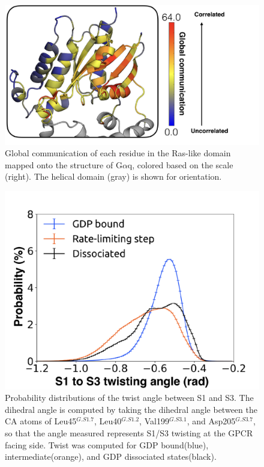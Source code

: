 \documentclass[../main.tex]{subfiles}
\begin{document}
    \begin{figure}[!htb] %
        \centering
        \includegraphics[width=5in]{ch4-fig8-supp1.png}
        \caption[Global communication of each residue in the Ras-like domain mapped onto the structure of G$\alpha$q, colored based on the scale (right). ]
            {Global communication of each residue in the Ras-like domain mapped onto the structure of G$\alpha$q, colored based on the scale (right). The helical domain (gray) is shown for orientation.}
        \label{fig:ch4-fig8-supp1}
    \end{figure}

    \begin{figure}[!htb] %
        \centering
        \includegraphics[width=5in]{ch4-fig9-supp1.png}
        \caption[Probability distributions of the twist angle between S1 and S3.]
            {Probability distributions of the twist angle between S1 and S3. The dihedral angle is computed by taking the dihedral angle between the CA atoms of Leu45$^{G.S1.7}$, Leu40$^{G.S1.2}$, Val199$^{G.S3.1}$, and Asp205$^{G.S3.7}$, so that the angle measured represents S1/S3 twisting at the GPCR facing side. Twist was computed for GDP bound(blue), intermediate(orange), and GDP dissociated states(black).}
        \label{fig:ch4-fig9-supp1}
    \end{figure}
	
\end{document}
